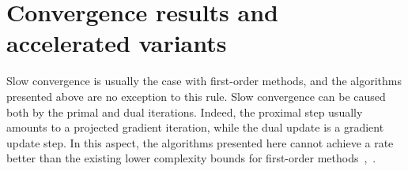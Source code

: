 \documentclass[openany]{now}
\newcommand{\eg}{{\it e.g.}}
\begin{document}

\chapter{Convergence results and accelerated variants}{\label{ch:acceleration}}
Slow convergence is usually the case with first-order methods, and the algorithms presented above are no exception to this rule. Slow convergence can be caused both by the primal and dual iterations. Indeed, the proximal step usually amounts to a projected gradient iteration, while the dual update is a gradient update step. In this aspect, the algorithms presented here cannot achieve a rate better than the existing lower complexity bounds for first-order methods~\cite{opac-b1091338},~\cite{nestbook}.
\end{document}
